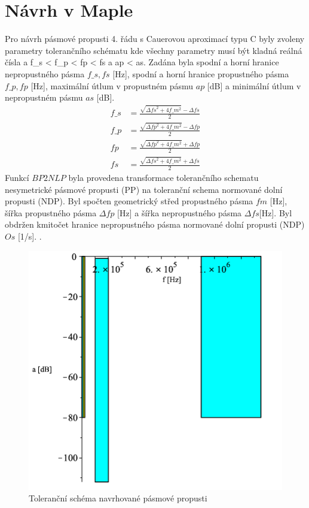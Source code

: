 \documentclass[twoside]{article}
\begin{document}
\section{Návrh v Maple}
Pro návrh pásmové propusti 4. řádu s Cauerovou aproximací typu C byly zvoleny parametry tolerančního schématu 
\noindent kde všechny parametry musí být kladná reálná čísla a f\_s <  f\_p < fp < fs a ap < as. Zadána byla spodní a horní hranice nepropustného pásma $f\_s,fs$ [Hz], spodní a horní hranice propustného pásma $f\_p,fp$ [Hz], maximální útlum v propustném pásmu $ap$ [dB] a minimální útlum v nepropustném pásmu $as$ [dB].
\begin{align}
f\_s &= \frac{\sqrt{\Delta{fs}^2+4f\_m ^2}-\Delta{fs}}{2}\\
f\_p &= \frac{\sqrt{\Delta{fp}^2+4f\_m ^2}-\Delta{fp}}{2}\\
fp &= \frac{\sqrt{\Delta{fp}^2+4f\_m ^2}+\Delta{fp}}{2}\\
fs &= \frac{\sqrt{\Delta{fs}^2+4f\_m ^2}+\Delta{fs}}{2}
\end{align}
Funkcí $BP2NLP$ byla provedena transformace tolerančního schematu nesymetrické pásmové propusti (PP) na toleranční schema normované dolní propusti (NDP). Byl spočten geometrický střed propustného pásma $fm$ [Hz], šířka propustného pásma $\Delta{fp}$ [Hz] a šířka nepropustného pásma $\Delta{fs} $[Hz].
\noindent Byl obdržen kmitočet hranice nepropustného pásma normované dolní propusti (NDP) $Os$ [1/s].
.
\begin{figure}[H]
\centering
\includegraphics[scale=0.5]{tolsch2.png}
\caption{Toleranční schéma navrhované pásmové propusti}
\end{figure}
\end{document}
